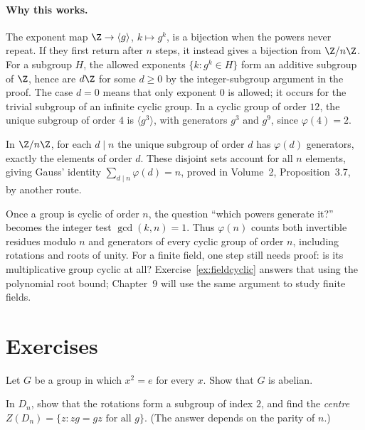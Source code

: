 \paragraph{Why this works.}
The exponent map $\Z\to\langle g\rangle$, $k\mapsto g^k$, is a
bijection when the powers never repeat. If they first return after $n$
steps, it instead gives a bijection from $\Z/n\Z$. For a subgroup $H$,
the allowed exponents $\{k:g^k\in H\}$ form an additive subgroup of
$\Z$, hence are $d\Z$ for some $d\ge0$ by the integer-subgroup
argument in the proof. The case $d=0$ means that only exponent $0$ is
allowed; it occurs for the trivial subgroup of an infinite cyclic group.
In a cyclic group of order $12$, the unique subgroup of order $4$ is
$\langle g^3\rangle$, with generators $g^3$ and $g^9$, since $\varphi(4)=2$.

In $\Z/n\Z$, for each $d\mid n$ the unique subgroup of order $d$
has $\varphi(d)$ generators, exactly the elements of order $d$.
These disjoint sets account for all $n$ elements, giving Gauss' identity
$\sum_{d\mid n}\varphi(d)=n$, proved in Volume~2, Proposition~3.7, by another route.

\begin{beauty}
Once a group is cyclic of order $n$, the question ``which powers generate
it?'' becomes the integer test $\gcd(k,n)=1$. Thus $\varphi(n)$ counts
both invertible residues modulo $n$ and generators of every cyclic group
of order $n$, including rotations and roots of unity. For a finite field,
one step still needs proof: is its multiplicative group cyclic at all?
Exercise~\ref{ex:fieldcyclic} answers that using the polynomial root bound;
Chapter~9 will use the same argument to study finite fields.
\end{beauty}

\section{Exercises}

\begin{exercise}[$\star$]\label{ex:square}
Let $G$ be a group in which $x^2=e$ for every $x$. Show that $G$ is abelian.
\end{exercise}

\begin{exercise}[$\star$]\label{ex:dihedralcentre}
In $D_n$, show that the rotations form a subgroup of index $2$, and find the \emph{centre} $Z(D_n)=\{z:zg=gz\text{ for all }g\}$. (The answer depends on the parity of $n$.)
\end{exercise}

